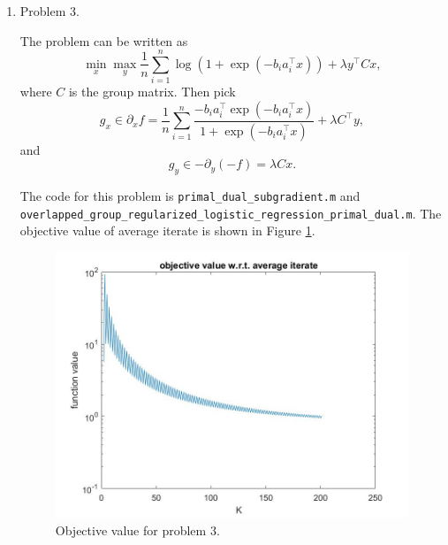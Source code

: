 \documentclass{article}
\DeclareMathOperator*{\argmin}{arg\,min}
\begin{document}
\begin{enumerate}




\item Problem 3.

The problem can be written as
$$
\min_{x}\max_y \frac{1}{n}\sum_{i=1}^{n}\log(1+\exp(-b_ia_i^\top x))+\lambda y^\top C x,
$$
where $C$ is the group matrix. Then pick
$$
g_x \in \partial_x f = \frac{1}{n}\sum_{i=1}^{n}\frac{-b_ia_i^\top\exp(-b_ia_i^\top x)}{1+\exp(-b_ia_i^\top x)} + \lambda C^\top y,
$$
and
$$
g_y \in -\partial_y (-f) = \lambda C x.
$$

The code for this problem is \texttt{primal\_dual\_subgradient.m} and \\ \texttt{overlapped\_group\_regularized\_logistic\_regression\_primal\_dual.m}. The objective value of average iterate is shown in Figure \ref{problem 3}.

\begin{figure}[h]
\centering
\includegraphics[scale=0.3]{problem3.jpg}
\caption{Objective value for problem 3.}
\label{problem 3}
\end{figure}


\end{enumerate}
\end{document}
